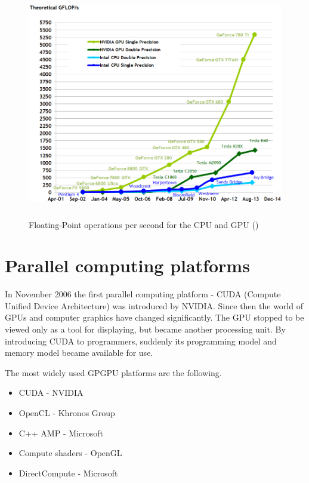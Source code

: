 \begin{center}
\begin{figure}[h]
	\centering\includegraphics[height=10cm]{fig/floating-point-operations-per-second.png}
	\caption{Floating-Point operations per second for the CPU and GPU (\cite{cuda-toolkit-docs})}
\end{figure}
\end{center}

\section{Parallel computing platforms}

In November 2006 the first parallel computing platform - CUDA (Compute Unified Device Architecture) was introduced by NVIDIA. Since then the world of GPUs and computer graphics have changed significantly. The GPU stopped to be viewed only as a tool for displaying, but became another processing unit. By introducing CUDA to programmers, suddenly its programming model and memory model became available for use. 

The most widely used GPGPU platforms are the following.

\begin{itemize}
	\item CUDA - NVIDIA
	\item OpenCL - Khronos Group
	\item C++ AMP - Microsoft	
	\item Compute shaders - OpenGL
	\item DirectCompute - Microsoft
\end{itemize}

